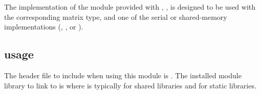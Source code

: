 
The {\klu} implementation of the {\sunlinsol} module provided with
{\sundials}, {\sunlinsolklu}, is designed to be used with the
corresponding {\sunmatsparse} matrix type, and one of the serial or
shared-memory {\nvector} implementations ({\nvecs}, {\nvecopenmp}, or 
{\nvecpthreads}).


\subsection{{\sunlinsolklu} usage}\label{ss:sunlinsol_klu_usage}

The header file to include when using this module 
is . The installed module
library to link to is
where  is typically  for shared libraries and
 for static libraries. 

